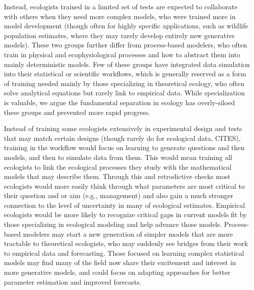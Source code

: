 \documentclass[11pt]{article}
\begin{document}
Instead, ecologists trained in a limited set of tests are expected to collaborate with others when they need more complex models, who were trained more in model development (though often for highly specific applications, such as wildlife population estimates, where they may rarely develop entirely new generative models). These two groups further differ from process-based modelers, who often train in physical and ecophysiological processes and how to abstract them into mainly deterministic models. %
Few of these groups have integrated data simulation into their statistical or scientific workflows, which is generally reserved as a form of training needed mainly by those specializing in theoretical ecology, who often solve analytical equations but rarely link to empirical data. While specialization is valuable, we argue the fundamental %
separation in ecology has overly-siloed these groups and prevented more rapid progress.

Instead of training some ecologists extensively in experimental design and tests that may match certain designs (though rarely do for ecological data, CITES), training in the workflow would focus on learning to generate questions and then models, and then to simulate data from them. This would mean training all ecologists to link the ecological processes they study with the mathematical models that may describe them. Through this and retrodictive checks most ecologists would more easily think through what parameters are most critical to their question and or aim (e.g., management) and also gain a much stronger connection to the level of uncertainty in many of ecological estimates. Empirical ecologists would be more likely to recognize critical gaps in current models fit by those specializing in ecological modeling and help advance those models. Process-based modelers may start a new generation of simpler models that are more tractable to theoretical ecologists, who may suddenly see bridges from their work to empirical data and forecasting. 
Those focused on learning complex statistical models may find many of the field now share their excitement and interest in more generative models, and could focus on adapting approaches for better parameter estimation and improved forecasts.
\end{document}
